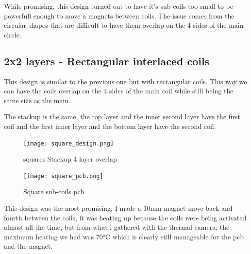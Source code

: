 While promising, this design turned out to have it's sub coils too small to be powerfull enough to move a magnets between coils. The issue comes from the circular shapes that are difficult to have them overlap on the 4 sides of the main circle.

\newpage


\subsection{2x2 layers - Rectangular interlaced coils}

This design is similar to the previous one but with rectangular coils. This way we can have the coils overlap on the 4 sides of the main coil while still being the same size as the main.

The stackup is the same, the top layer and the inner second layer have the first coil and the first inner layer and the bottom layer have the second coil.

\begin{figure}[H]
	\centering
	\texttt{[image: square\_design.png]}
	\caption[Squares 4 layer overlap]{squares Stackup 4 layer overlap}
	\label{fig:square_design}
\end{figure}

\begin{figure}[H]
	\centering
	\texttt{[image: square\_pcb.png]}
	\caption[Square sub-coils \gls{pcb}]{Square sub-coils \gls{pcb}}
	\label{fig:square_pcb}
\end{figure}

This design was the most promising, I made a 10mm magnet move back and fourth between the coils, it was heating up because the coils were being activated almost all the time, but from what i gathered with the thermal camera, the maximum heating we had was 70°C which is clearly still manageable for the \gls{pcb} and the magnet.